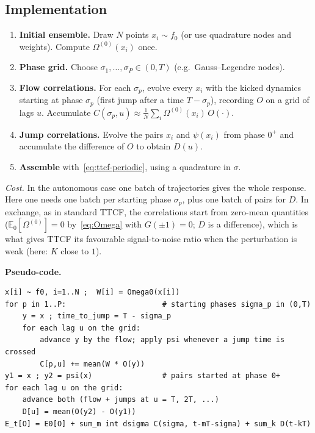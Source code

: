 \documentclass[11pt,a4paper]{article}
\theoremstyle{remark}
\newcommand{\E}{\mathbb{E}}
\begin{document}
\subsection{Implementation}
\begin{enumerate}
\item \textbf{Initial ensemble.} Draw $N$ points $x_i\sim f_0$ (or use
  quadrature nodes and weights). Compute $\Omega^{(0)}(x_i)$ once.
\item \textbf{Phase grid.} Choose $\sigma_1,\dots,\sigma_P\in(0,T)$ (e.g.\
  Gauss--Legendre nodes).
\item \textbf{Flow correlations.} For each $\sigma_p$, evolve every $x_i$
  with the kicked dynamics starting at phase $\sigma_p$ (first jump after a
  time $T-\sigma_p$), recording $O$ on a grid of lags $u$. Accumulate
  $C(\sigma_p,u)\approx\frac1N\sum_i\Omega^{(0)}(x_i)\,O(\cdot)$.
\item \textbf{Jump correlations.} Evolve the pairs $x_i$ and $\psi(x_i)$
  from phase $0^+$ and accumulate the difference of $O$ to obtain $D(u)$.
\item \textbf{Assemble} with~\eqref{eq:ttcf-periodic}, using a quadrature in
  $\sigma$.
\end{enumerate}
\emph{Cost.} In the autonomous case one batch of trajectories gives the whole
response. Here one needs one batch per starting phase $\sigma_p$, plus one
batch of pairs for $D$. In exchange, as in standard TTCF, the correlations
start from zero-mean quantities ($\E_0[\Omega^{(0)}]=0$ by~\eqref{eq:Omega}
with $G(\pm1)=0$; $D$ is a difference), which is what gives TTCF its
favourable signal-to-noise ratio when the perturbation is weak (here: $K$
close to $1$).

\noindent\textbf{Pseudo-code.}\par\smallskip
\begin{lstlisting}
x[i] ~ f0, i=1..N ;  W[i] = Omega0(x[i])
for p in 1..P:                      # starting phases sigma_p in (0,T)
    y = x ; time_to_jump = T - sigma_p
    for each lag u on the grid:
        advance y by the flow; apply psi whenever a jump time is crossed
        C[p,u] += mean(W * O(y))
y1 = x ; y2 = psi(x)                # pairs started at phase 0+
for each lag u on the grid:
    advance both (flow + jumps at u = T, 2T, ...)
    D[u] = mean(O(y2) - O(y1))
E_t[O] = E0[O] + sum_m int dsigma C(sigma, t-mT-sigma) + sum_k D(t-kT)
\end{lstlisting}

\end{document}
